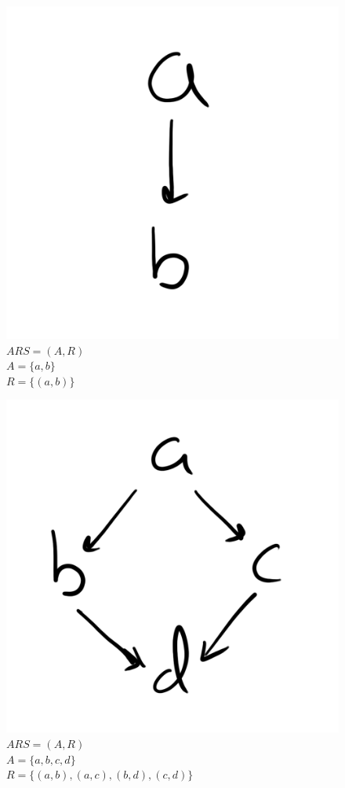 \documentclass{article}
\begin{document}
\begin{figure}[H]
  \centering
  \includegraphics[scale=0.06]{gen11}
  \caption[] {
    $ARS = (A, R)$
    \\ $A=\{a, b\}$
    \\ $R=\{(a, b)\}$
    \endtabular}
\end{figure}

\begin{figure}[H]
  \centering
  \includegraphics[scale=0.06]{gen12}
  \caption[] {
    $ARS = (A, R)$
    \\ $A=\{a, b, c, d\}$
    \\ $R=\{(a, b), (a, c), (b, d), (c, d)\}$
    \endtabular}
\end{figure}
\end{document}
